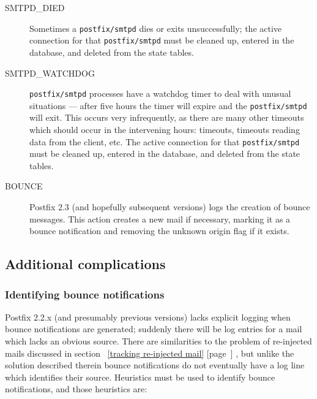 \documentclass[a4paper,12pt,draft]{article}
\newcommand{\refwithpage}[1]{%
    \empty{}\ref{#1} [page~\pageref{#1}]%
}
\newcommand{\daemon}[1]{%
    \texttt{postfix/#1}%
}
\begin{document}
\begin{description}
    \item [SMTPD\_DIED] Sometimes a \daemon{smtpd} dies or exits
        unsuccessfully; the active connection for that \daemon{smtpd} must
        be cleaned up, entered in the database, and deleted from the state
        tables.

    \item [SMTPD\_WATCHDOG] \daemon{smtpd} processes have a watchdog timer
        to deal with unusual situations --- after five hours the timer will
        expire and the \daemon{smtpd} will exit.  This occurs very
        infrequently, as there are many other timeouts which should occur
        in the intervening hours: \DNS{} timeouts, timeouts reading data
        from the client, etc.  The active connection for that
        \daemon{smtpd} must be cleaned up, entered in the database, and
        deleted from the state tables.

    \item [BOUNCE] Postfix 2.3 (and hopefully subsequent versions) logs the
        creation of bounce messages.  This action creates a new mail if
        necessary, marking it as a bounce notification and removing the
        unknown origin flag if it exists.

\end{description}

\subsection{Additional complications}

\label{additional complications}

\subsubsection{Identifying bounce notifications}

\label{identifying-bounce-notifications}

Postfix 2.2.x (and presumably previous versions) lacks explicit logging
when bounce notifications are generated; suddenly there will be log entries
for a mail which lacks an obvious source.  There are similarities to the
problem of re-injected mails discussed in section~\refwithpage{tracking
re-injected mail}, but unlike the solution described therein bounce
notifications do not eventually have a log line which identifies their
source.  Heuristics must be used to identify bounce notifications, and
those heuristics are:
\end{document}
